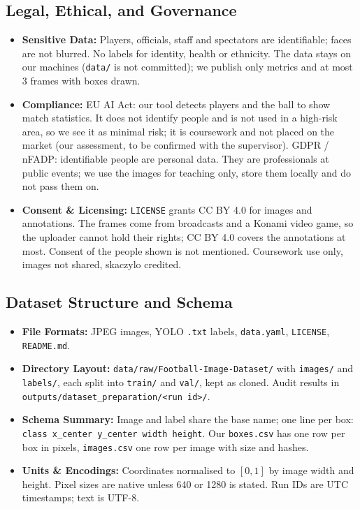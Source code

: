 \documentclass[11pt, a4paper]{article}
\begin{document}
\subsection{Legal, Ethical, and Governance}
\begin{itemize}
    \item \textbf{Sensitive Data:} Players, officials, staff and spectators are identifiable; faces are not blurred. No labels for identity, health or ethnicity. The data stays on our machines (\texttt{data/} is not committed); we publish only metrics and at most 3 frames with boxes drawn.
    \item \textbf{Compliance:} EU AI Act: our tool detects players and the ball to show match statistics. It does not identify people and is not used in a high-risk area, so we see it as minimal risk; it is coursework and not placed on the market (our assessment, to be confirmed with the supervisor). GDPR / nFADP: identifiable people are personal data. They are professionals at public events; we use the images for teaching only, store them locally and do not pass them on.
    \item \textbf{Consent \& Licensing:} \texttt{LICENSE} grants CC BY 4.0 for images and annotations. The frames come from broadcasts and a Konami video game, so the uploader cannot hold their rights; CC BY 4.0 covers the annotations at most. Consent of the people shown is not mentioned. Coursework use only, images not shared, skaczylo credited.
\end{itemize}

\subsection{Dataset Structure and Schema}
\begin{itemize}
    \item \textbf{File Formats:} JPEG images, YOLO \texttt{.txt} labels, \texttt{data.yaml}, \texttt{LICENSE}, \texttt{README.md}.
    \item \textbf{Directory Layout:} \texttt{data/raw/Football-Image-Dataset/} with \texttt{images/} and \texttt{labels/}, each split into \texttt{train/} and \texttt{val/}, kept as cloned. Audit results in \texttt{outputs/dataset\_preparation/<run id>/}.
    \item \textbf{Schema Summary:} Image and label share the base name; one line per box: \texttt{class x\_center y\_center width height}. Our \texttt{boxes.csv} has one row per box in pixels, \texttt{images.csv} one row per image with size and hashes.
    \item \textbf{Units \& Encodings:} Coordinates normalised to $[0,1]$ by image width and height. Pixel sizes are native unless 640 or 1280 is stated. Run IDs are UTC timestamps; text is UTF-8.
\end{itemize}
\end{document}
